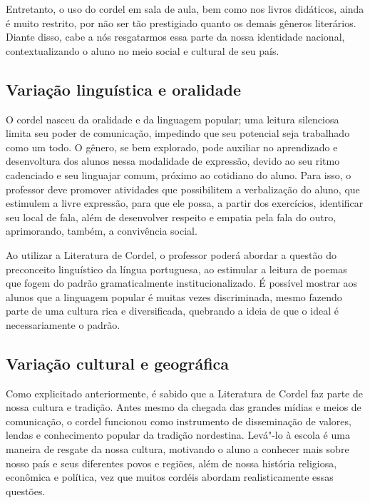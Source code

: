 \documentclass[12pt]{extarticle}
\begin{document}
Entretanto, o uso do cordel em sala de aula, bem como nos livros
didáticos, ainda é muito restrito, por não ser tão prestigiado quanto os
demais gêneros literários. Diante disso, cabe a nós resgatarmos essa
parte da nossa identidade nacional, contextualizando o aluno no meio
social e cultural de seu país.


\subsection{Variação linguística e oralidade}

O cordel nasceu da oralidade e da linguagem popular; uma leitura
silenciosa limita seu poder de comunicação, impedindo que seu potencial
seja trabalhado como um todo. O gênero, se bem explorado, pode auxiliar
no aprendizado e desenvoltura dos alunos nessa modalidade de expressão,
devido ao seu ritmo cadenciado e seu linguajar comum, próximo ao
cotidiano do aluno. Para isso, o professor deve promover atividades que
possibilitem a verbalização do aluno, que estimulem a livre expressão,
para que ele possa, a partir dos exercícios, identificar seu local de
fala, além de desenvolver respeito e empatia pela fala do outro,
aprimorando, também, a convivência social.

Ao utilizar a Literatura de Cordel, o professor poderá abordar a questão
do preconceito linguístico da língua portuguesa, ao estimular a leitura
de poemas que fogem do padrão gramaticalmente institucionalizado. É
possível mostrar aos alunos que a linguagem popular é muitas vezes
discriminada, mesmo fazendo parte de uma cultura rica e diversificada,
quebrando a ideia de que o ideal é necessariamente o padrão.

\subsection{Variação cultural e geográfica}

Como explicitado anteriormente, é sabido que a Literatura de Cordel faz
parte de nossa cultura e tradição. Antes mesmo da chegada das grandes
mídias e meios de comunicação, o cordel funcionou como instrumento de
disseminação de valores, lendas e conhecimento popular da tradição
nordestina. Levá"-lo à escola é uma maneira de resgate da nossa cultura,
motivando o aluno a conhecer mais sobre nosso país e seus diferentes
povos e regiões, além de nossa história religiosa, econômica e política,
vez que muitos cordéis abordam realisticamente essas questões.
\end{document}
